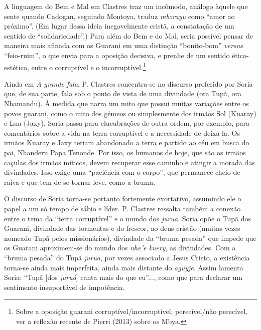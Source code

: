 A linguagem do Bem e Mal em Clastres traz um incômodo, análogo àquele
que sente quando Cadogan, seguindo Montoya, traduz \emph{mborayu} como
``amor ao próximo''. (Em lugar dessa ideia inegavelmente cristã, a
constatação de um sentido de ``solidariedade''.) Para além do Bem e do
Mal, seria possível pensar de maneira mais afinada com os Guarani em uma
distinção ``bonito-bom'' \emph{versus} ``feio-ruim'', o que envia para a
oposição decisiva, e prenhe de um sentido ético-estético, entre o
corruptível e o incorruptível.\footnote{Sobre a oposição guarani
  corruptível/incorruptível, perecível/não perecível, ver a reflexão
  recente de Pierri (2013) sobre os Mbya.}

Ainda em \emph{A grande fala}, P. Clastres concentra-se no discurso
proferido por Soria que, de sua parte, fala sob o ponto de vista de uma
divindade (ora Tupã, ora Nhamandu). À medida que narra um mito que
possui muitas variações entre os povos guarani, como o mito dos gêmeos
ou simplesmente dos irmãos Sol (Kuaray) e Lua (Jaxy), Soria passa para
elucubrações de outra ordem, por exemplo, para comentários sobre a vida
na terra corruptível e a necessidade de deixá-la. Os irmãos Kuaray e
Jaxy teriam abandonado a terra e partido ao céu em busca do pai,
Nhanderu Papa Tenonde. Por isso, os humanos de hoje, que são os irmãos
caçulas dos irmãos míticos, devem recuperar esse caminho e atingir a
morada das divindades. Isso exige uma ``paciência com o corpo'', que
permanece cheio de raiva e que tem de se tornar leve, como a bruma.

O discurso de Soria torna-se portanto fortemente exortativo, assumindo
ele o papel a um só tempo de sábio e líder. P. Clastres ressalta também
a conexão entre o tema da ``terra corruptível'' e o mundo dos
\emph{jurua}. Soria opõe o Tupã dos Guarani, divindade das tormentas e
do frescor, ao deus cristão (muitas vezes nomeado Tupã pelos
missionários), divindade da ``bruma pesada'' que impede que os Guarani
aproximem-se do mundo dos \emph{nhe'e kuery}, as divindades. Com a
``bruma pesada'' do Tupã \emph{jurua}, por vezes associado a Jesus
Cristo, a existência torna-se ainda mais imperfeita, ainda mais distante
do \emph{aguyje}. Assim lamenta Soria: ``Tupã {[}dos \emph{juruá}{]}
canta mais do que eu''..., como que para declarar um sentimento
insuportável de impotência.

